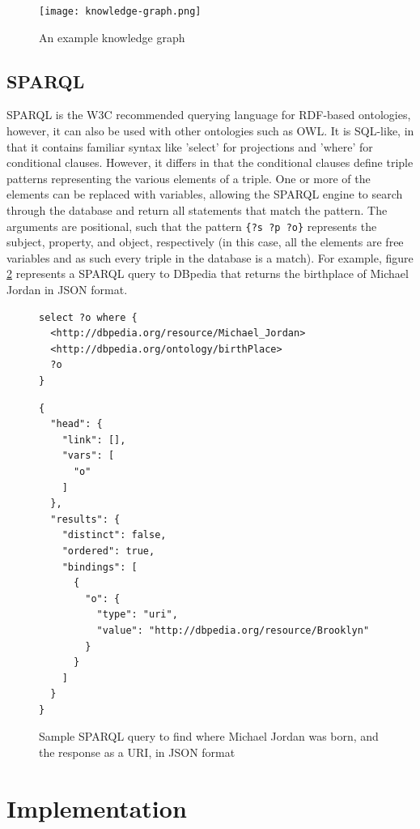 \documentclass[sigplan,screen]{acmart}
\begin{document}
\begin{figure}[h]
    \texttt{[image: knowledge-graph.png]}
    \caption{An example knowledge graph}
    \label{fig:knowledge_graph}
\end{figure}


\subsection{SPARQL}

SPARQL is the W3C recommended querying language for RDF-based ontologies, however, it can also be used with other ontologies such as OWL. It is SQL-like, in that it contains familiar syntax like 'select' for projections and 'where' for conditional clauses. However, it differs in that the conditional clauses define triple patterns representing the various elements of a triple. One or more of the elements can be replaced with variables, allowing the SPARQL engine to search through the database and return all statements that match the pattern. The arguments are positional, such that the pattern \texttt{\{?s ?p ?o\}} represents the subject, property, and object, respectively (in this case, all the elements are free variables and as such every triple in the database is a match). For example, figure \ref{figure:sample-query} represents a SPARQL query to DBpedia that returns the birthplace of Michael Jordan in JSON format.

\begin{figure}[h]
\begin{lstlisting}[language=SPARQL,frame=single,breaklines=true]
select ?o where {
  <http://dbpedia.org/resource/Michael_Jordan>
  <http://dbpedia.org/ontology/birthPlace>
  ?o
}
\end{lstlisting}

\begin{lstlisting}[frame=single,breaklines=true]
{
  "head": {
    "link": [],
    "vars": [
      "o"
    ]
  },
  "results": {
    "distinct": false,
    "ordered": true,
    "bindings": [
      {
        "o": {
          "type": "uri",
          "value": "http://dbpedia.org/resource/Brooklyn"
        }
      }
    ]
  }
}
\end{lstlisting}
\caption{Sample SPARQL query to find where Michael Jordan was born, and the response as a URI, in JSON format}
\label{figure:sample-query}
\end{figure}

\section{Implementation}
\end{document}
